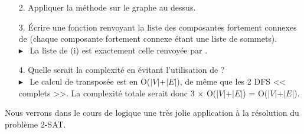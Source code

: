 \documentclass[mp2i]{exam}
\begin{document}
	\begin{enumerate}
		\item[2.] Appliquer la méthode sur le graphe au dessus.
		\item[3.] Écrire une fonction  renvoyant la liste des composantes fortement connexes de  (chaque composante fortement connexe étant une liste de sommets).
		\if{}
		\\$\blacktriangleright$ ~La liste de (i) est exactement celle renvoyée par . 
		\begin{center}
		\end{center}
		\fi
		\item[4.] Quelle serait la complexité en évitant l'utilisation de ?
		\if{}
		\\$\blacktriangleright$ ~Le calcul de transposée est en O($\vert V \vert + \vert E \vert$), de même que les 2 DFS << complets >>. La complexité totale serait donc 3 $\times$ O($\vert V \vert + \vert E \vert$) = O($\vert V \vert + \vert E \vert$). 
		\fi
	\end{enumerate}
	Nous verrons dans le cours de logique une très jolie application à la résolution du problème 2-SAT.
	
	\if{} \newpage \fi
\end{document}
